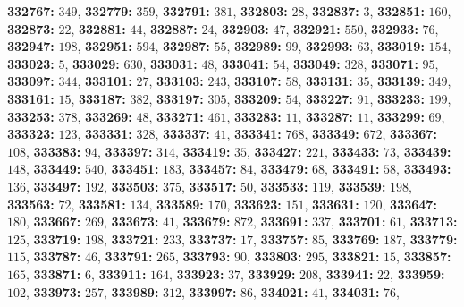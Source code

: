 \textsf{\bfseries 332767:} $349$, \textsf{\bfseries 332779:} $359$, \textsf{\bfseries 332791:} $381$, \textsf{\bfseries 332803:} $28$, \textsf{\bfseries 332837:} $3$, \textsf{\bfseries 332851:} $160$, \textsf{\bfseries 332873:} $22$, \textsf{\bfseries 332881:} $44$, \textsf{\bfseries 332887:} $24$, \textsf{\bfseries 332903:} $47$, \textsf{\bfseries 332921:} $550$, \textsf{\bfseries 332933:} $76$, \textsf{\bfseries 332947:} $198$, \textsf{\bfseries 332951:} $594$, \textsf{\bfseries 332987:} $55$, \textsf{\bfseries 332989:} $99$, \textsf{\bfseries 332993:} $63$, \textsf{\bfseries 333019:} $154$, \textsf{\bfseries 333023:} $5$, \textsf{\bfseries 333029:} $630$, \textsf{\bfseries 333031:} $48$, \textsf{\bfseries 333041:} $54$, \textsf{\bfseries 333049:} $328$, \textsf{\bfseries 333071:} $95$, \textsf{\bfseries 333097:} $344$, \textsf{\bfseries 333101:} $27$, \textsf{\bfseries 333103:} $243$, \textsf{\bfseries 333107:} $58$, \textsf{\bfseries 333131:} $35$, \textsf{\bfseries 333139:} $349$, \textsf{\bfseries 333161:} $15$, \textsf{\bfseries 333187:} $382$, \textsf{\bfseries 333197:} $305$, \textsf{\bfseries 333209:} $54$, \textsf{\bfseries 333227:} $91$, \textsf{\bfseries 333233:} $199$, \textsf{\bfseries 333253:} $378$, \textsf{\bfseries 333269:} $48$, \textsf{\bfseries 333271:} $461$, \textsf{\bfseries 333283:} $11$, \textsf{\bfseries 333287:} $11$, \textsf{\bfseries 333299:} $69$, \textsf{\bfseries 333323:} $123$, \textsf{\bfseries 333331:} $328$, \textsf{\bfseries 333337:} $41$, \textsf{\bfseries 333341:} $768$, \textsf{\bfseries 333349:} $672$, \textsf{\bfseries 333367:} $108$, \textsf{\bfseries 333383:} $94$, \textsf{\bfseries 333397:} $314$, \textsf{\bfseries 333419:} $35$, \textsf{\bfseries 333427:} $221$, \textsf{\bfseries 333433:} $73$, \textsf{\bfseries 333439:} $148$, \textsf{\bfseries 333449:} $540$, \textsf{\bfseries 333451:} $183$, \textsf{\bfseries 333457:} $84$, \textsf{\bfseries 333479:} $68$, \textsf{\bfseries 333491:} $58$, \textsf{\bfseries 333493:} $136$, \textsf{\bfseries 333497:} $192$, \textsf{\bfseries 333503:} $375$, \textsf{\bfseries 333517:} $50$, \textsf{\bfseries 333533:} $119$, \textsf{\bfseries 333539:} $198$, \textsf{\bfseries 333563:} $72$, \textsf{\bfseries 333581:} $134$, \textsf{\bfseries 333589:} $170$, \textsf{\bfseries 333623:} $151$, \textsf{\bfseries 333631:} $120$, \textsf{\bfseries 333647:} $180$, \textsf{\bfseries 333667:} $269$, \textsf{\bfseries 333673:} $41$, \textsf{\bfseries 333679:} $872$, \textsf{\bfseries 333691:} $337$, \textsf{\bfseries 333701:} $61$, \textsf{\bfseries 333713:} $125$, \textsf{\bfseries 333719:} $198$, \textsf{\bfseries 333721:} $233$, \textsf{\bfseries 333737:} $17$, \textsf{\bfseries 333757:} $85$, \textsf{\bfseries 333769:} $187$, \textsf{\bfseries 333779:} $115$, \textsf{\bfseries 333787:} $46$, \textsf{\bfseries 333791:} $265$, \textsf{\bfseries 333793:} $90$, \textsf{\bfseries 333803:} $295$, \textsf{\bfseries 333821:} $15$, \textsf{\bfseries 333857:} $165$, \textsf{\bfseries 333871:} $6$, \textsf{\bfseries 333911:} $164$, \textsf{\bfseries 333923:} $37$, \textsf{\bfseries 333929:} $208$, \textsf{\bfseries 333941:} $22$, \textsf{\bfseries 333959:} $102$, \textsf{\bfseries 333973:} $257$, \textsf{\bfseries 333989:} $312$, \textsf{\bfseries 333997:} $86$, \textsf{\bfseries 334021:} $41$, \textsf{\bfseries 334031:} $76$, 
